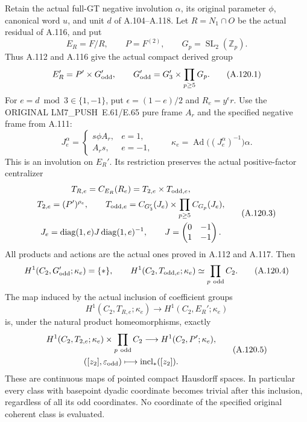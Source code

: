 Retain the actual full-GT negative involution \(\alpha\), its original
parameter \(\phi\), canonical word \(u\), and unit \(d\) of A.104--A.118.
Let \(R=N_1\cap O\) be the actual residual of A.116, and put
\[
 E_R=F/R,\qquad P=F^{(2)},\qquad
 G_p=\operatorname{SL}_2(\mathbb Z_p).
\]
Thus A.112 and A.116 give the actual compact derived group
\[
 E_R'=P'\times G_{\rm odd}',\qquad
 G_{\rm odd}'=G_3'\times\prod_{p\geq5}G_p.
 \tag{A.120.1}
\]
For \(e=d\bmod3\in\{1,-1\}\), put
\(\epsilon=(1-e)/2\) and \(R_e=y^\epsilon r\).
Use the ORIGINAL LM7\_PUSH~E.61/E.65 pure frame \(A_r\) and the
specified negative frame from A.111:
\[
 J_e^\alpha=
 \begin{cases}
 s\phi A_r,&e=1,\\
 A_rs,&e=-1,
 \end{cases}
 \qquad
 \kappa_e=\operatorname{Ad}\bigl((J_e^\alpha)^{-1}\bigr)\alpha .
 \tag{A.120.2}
\]
This is an involution on \(E_R'\). Its restriction preserves
the actual positive-factor centralizer
\[
 \begin{gathered}
 T_{R,e}=C_{E_R}(R_e)=T_{2,e}\times T_{{\rm odd},e},\\
 T_{2,e}=(P')^{\rho_e},\qquad
 T_{{\rm odd},e}=C_{G_3'}(J_e)\times
                   \prod_{p\geq5}C_{G_p}(J_e),\\
 J_e=\operatorname{diag}(1,e)J\operatorname{diag}(1,e)^{-1},
 \qquad
 J=\begin{pmatrix}0&-1\\1&-1\end{pmatrix}.
 \end{gathered}
 \tag{A.120.3}
\]
All products and actions are the actual ones proved in A.112 and A.117.
Then
\[
 H^1(C_2,G_{\rm odd}';\kappa_e)=\{*\},
 \qquad
 H^1(C_2,T_{{\rm odd},e};\kappa_e)
       \simeq\prod_{p\ {\rm odd}}C_2 .
 \tag{A.120.4}
\]
The map induced by the actual inclusion of coefficient groups
\[
 H^1(C_2,T_{R,e};\kappa_e)
       \longrightarrow H^1(C_2,E_R';\kappa_e)
\]
is, under the natural product homeomorphisms, exactly
\[
 \begin{gathered}
 H^1(C_2,T_{2,e};\kappa_e)\times
       \prod_{p\ {\rm odd}}C_2
       \longrightarrow H^1(C_2,P';\kappa_e),\\
 ([z_2],\varepsilon_{\rm odd})\longmapsto
             \operatorname{incl}_*([z_2]).
 \end{gathered}
 \tag{A.120.5}
\]
These are continuous maps of pointed compact Hausdorff spaces.
In particular every class with basepoint dyadic coordinate becomes
trivial after this inclusion, regardless of all its odd coordinates.
No coordinate of the specified original coherent class is evaluated.

